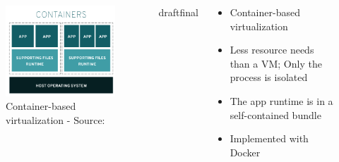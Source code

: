 \documentclass{beamer}
\def\final{final}
\def\status{draft}
\begin{document}
\begin{frame}{}
  \begin{columns}[totalwidth=\textwidth]
    \begin{column}{0.5\textwidth}
      \begin{figure}
        \includegraphics[width=1.1\textwidth]{img/docker-vm-redhat.png}
        \caption{\footnotesize Container-based virtualization - \textcolor{uos-grey-full}{Source: {\cite{redhat_pic}}}}
      \end{figure}
    \end{column}

    \ifx\status\final{}
      \pause{}
    \fi


    \begin{column}{0.4\textwidth}
      \begin{itemize}
        \setlength\itemsep{0.6em}
        \item Container-based virtualization
        \item Less resource needs than a VM; Only the process is isolated
        \item The app runtime is in a self-contained bundle
        \item Implemented with Docker
      \end{itemize}
    \end{column}
  \end{columns}
\end{frame}
\end{document}

